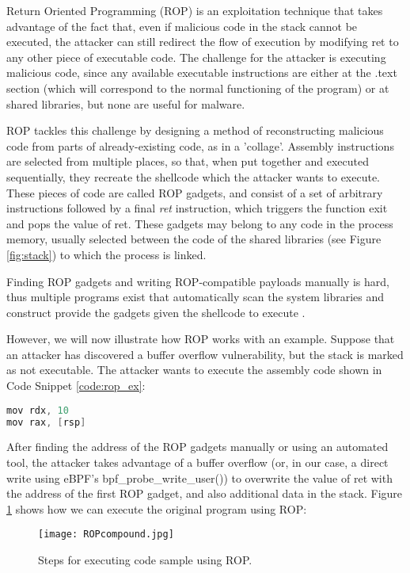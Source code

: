 Return Oriented Programming (ROP) is an exploitation technique that takes advantage of the fact that, even if malicious code in the stack cannot be executed, the attacker can still redirect the flow of execution by modifying ret to any other piece of executable code. The challenge for the attacker is executing malicious code, since any available executable instructions are either at the .text section (which will correspond to the normal functioning of the program) or at shared libraries, but none are useful for malware. 

ROP tackles this challenge by designing a method of reconstructing malicious code from parts of already-existing code, as in a 'collage'. Assembly instructions are selected from multiple places, so that, when put together and executed sequentially, they recreate the shellcode which the attacker wants to execute. These pieces of code are called ROP gadgets, and consist of a set of arbitrary instructions followed by a final \textit{ret} instruction, which triggers the function exit and pops the value of ret. These gadgets may belong to any code in the process memory, usually selected between the code of the shared libraries (see Figure \ref{fig:stack}) to which the process is linked.

Finding ROP gadgets and writing ROP-compatible payloads manually is hard, thus multiple programs exist that automatically scan the system libraries and construct provide the gadgets given the shellcode to execute \cite{rop_prog_finder}.

However, we will now illustrate how ROP works with an example. Suppose that an attacker has discovered a buffer overflow vulnerability, but the stack is marked as not executable. The attacker wants to execute the assembly code shown in Code Snippet \ref{code:rop_ex}:

\begin{lstlisting}[language=C, caption={Sample program to run using ROP.}, label={code:rop_ex}]
mov rdx, 10
mov rax, [rsp]
\end{lstlisting}

After finding the address of the ROP gadgets manually or using an automated tool, the attacker takes advantage of a buffer overflow (or, in our case, a direct write using eBPF's bpf\_probe\_write\_user()) to overwrite the value of ret with the address of the first ROP gadget, and also additional data in the stack. Figure \ref{fig:rop_compund} shows how we can execute the original program using ROP:

\begin{figure}[htbp]
	\centering
	\texttt{[image: ROPcompound.jpg]}
	\caption{Steps for executing code sample using ROP.}
	\label{fig:rop_compund}
\end{figure}

